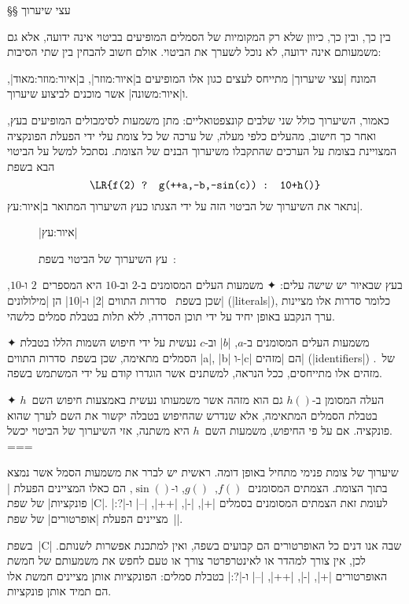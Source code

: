 §§ עצי שיערוך

בין כך, ובין כך, כיוון שלא רק המקומיות של הסמלים המופיעים בביטוי אינה ידועה,
אלא גם משמעותם אינה ידועה, לא נוכל לשערך את הביטוי. אולם חשוב להבחין בין שתי
הסיבות:

המונח \ע|עצי שיערוך| מתייחס לעצים כגון אלו המופיעים ב|איור:מוזר|,
ב|איור:מוזר:מאוד|, ו|איור:משונה| אשר
 מוכנים לביצוע שיערוך.

 כאמור, השיערוך כולל שני שלבים קונצפטואליים: מתן משמעות לסימבולים המופיעים בעץ,
 ואחר כך חישוב, מהעלים כלפי מעלה, של ערכה של כל צומת עלי ידי הפעלת הפונקציה
 המצויינת בצומת על הערכים שהתקבלו משיערוך הבנים של הצומת. נסתכל למשל על הביטוי
 הבא בשפת~\CPL
 \begin{equation}
   \label{eq:infix}
   \texttt{\LR{f(2) ? g(++a,--b,-sin(c)) : 10+h()}}
\end{equation}
 נתאר את השיערוך של הביטוי הזה על ידי הצגתו כעץ השיערוך המתואר ב|איור:עץ|.

\begin{figure}[H]
  \caption[עץ שיערוך של ביטוי בשפת~]
{עץ השיערוך של הביטוי בשפת~: }
  |איור:עץ|
  \centering
  
 \end{figure}

בעץ שבאיור יש שישה עלים:
✦ משמעות העלים המסומנים ב-$2$ וב-$10$ היא המספרים~$2$ ו-$10$, שכן בשפת~\CPL
סדרות התווים \T|2| ו-\T|10| הן \ע|מילולונים| (\E|literals|), כלומר סדרות אלו
מציינות ערך הנקבע באופן יחיד על ידי תוכן הסדרה, ללא תלות בטבלת סמלים כלשהי.

✦ משמעות העלים המסומנים ב-$a$, \E|$b$| וב-$c$ נעשית על ידי חיפוש השמות הללו
בטבלת הסמלים מתאימה, שכן בשפת~\CPL סדרות התווים \T|a|, \T|b| ו-\T|c| הם
\ע|מזהים| (\E|identifiers|) של~\CPL. מזהים אלו מתייחסים, ככל הנראה, למשתנים אשר
הוגדרו קודם על ידי המשתמש בשפה.

✦ העלה המסומן ב-$h()$ גם הוא מזהה אשר משמעותו נעשית באמצעות חיפוש השם~$h$ בטבלת
הסמלים המתאימה, אלא שנדרש שהחיפוש בטבלה יקשור את השם לערך שהוא פונקציה.
אם על פי החיפוש, משמעות השם~$h$ היא משתנה, אזי השיערוך של הביטוי יכשל.
===

שיערוך של צומת פנימי מתחיל באופן דומה. ראשית יש לברר את משמעות הסמל אשר
נמצא בתוך הצומת. הצמתים המסומנים~$f()$,~$g()$, ו-$\sin()$, הם כאלו המציינים הפעלת
\ע|פונקציות| של שפת \E|C|. לעומת זאת הצמתים המסומנים בסמלים \T|+|, \T|-|,
\T|++|, \T|--| ו-\T|?:| מציינים הפעלת \ע|אופרטורים| של שפת~\E|\CPL|.

בשפת~\E|C| שבה אנו דנים כל האופרטורים הם קבועים בשפה, ואין למתכנת אפשרות
לשנותם. לכן, אין צורך למהדר או לאינטרפרטר צורך או טעם לחפש את משמעותם של חמשת
האופרטורים \T|+|, \T|-|, \T|++|, \T|--| ו-\T|?:| בטבלת סמלים: הפונקציות אותן
מציינים חמשת אלו הם תמיד אותן פונקציות.


